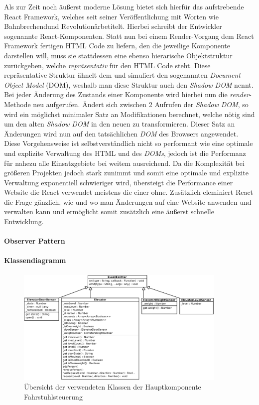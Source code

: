 Als zur Zeit noch äußerst moderne Lösung bietet sich hierfür das aufstrebende React Framework, welches seit seiner Veröffentlichung mit Worten wie \glqq Bahnbrechend\grqq und \glqq Revolutionär\grqq betitelt.
Hierbei schreibt der Entwickler sogenannte React-Komponenten.
Statt nun bei einem Render-Vorgang dem React Framework fertigen HTML Code zu liefern, den die jeweilige Komponente darstellen will, muss sie stattdessen eine ebenso hierarische Objektstruktur zurückgeben, welche \textit{repräsentativ} für den HTML Code steht.
Diese repräsentative Struktur ähnelt dem und simuliert den sogenannten \textit{Document Object Model} (DOM), weshalb man diese Struktur auch den \textit{Shadow DOM} nennt.
Bei jeder Änderung des Zustands einer Komponente wird hierbei nun die \textit{render}-Methode neu aufgerufen.
Ändert sich zwischen 2 Aufrufen der \textit{Shadow DOM}, so wird ein möglichst minimaler Satz an Modifikationen berechnet, welche nötig sind um den alten \textit{Shadow DOM} in den neuen zu transformieren.
Dieser Satz an Änderungen wird nun auf den tatsächlichen \textit{DOM} des Browsers angewendet. \\

Diese Vorgehensweise ist selbstverständlich nicht so performant wie eine optimale und explizite Verwaltung des HTML und des \textit{DOMs}, jedoch ist die Performanz für nahezu alle Einsatzgebiete bei weitem ausreichend.
Da die Komplexität bei größeren Projekten jedoch stark zunimmt und somit eine optimale und explizite Verwaltung exponentiell schwieriger wird, übersteigt die Performance einer Website die React verwendet meistens die einer ohne.
Zusätzlich eleminiert React die Frage gänzlich, wie und wo man Änderungen auf eine Website anwenden und verwalten kann und ermöglicht somit zusätzlich eine äußerst schnelle Entwicklung.

\paragraph{Observer Pattern}

\paragraph{Klassendiagramm}
\begin{figure}[h!]
	\centering
	\includegraphics[width=0.9\textwidth]{images/klassendiagramm.eps}
	\caption{Übersicht der verwendeten Klassen der Hauptkomponente Fahrstuhlsteuerung}
	\label{klassdiagramm}
\end{figure}

